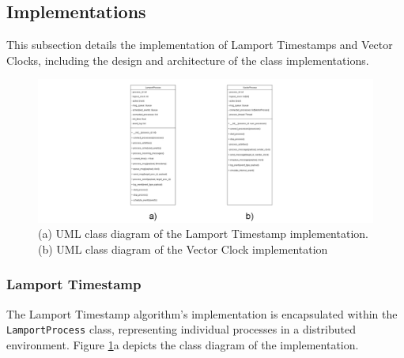 \documentclass{article}
\begin{document}
  \subsection{Implementations}
    This subsection details the implementation of Lamport Timestamps and Vector Clocks, including the design and architecture of the class implementations.
    
    \begin{figure}[h!]
      \centering
      \includegraphics[width=\textwidth]{img/class_diagram.png}
      \caption{(a) UML class diagram of the Lamport Timestamp implementation. (b) UML class diagram of the Vector Clock implementation}
      \label{fig:class_diagram}

    \end{figure}
    \subsubsection{Lamport Timestamp}
      The Lamport Timestamp algorithm's implementation is encapsulated within the \texttt{LamportProcess} class, representing individual processes in a distributed environment. Figure \ref*{fig:class_diagram}a depicts the class diagram of the implementation.
      
\end{document}
